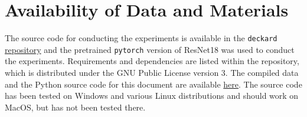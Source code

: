 \documentclass[sn-mathphys-num]{sn-jnl}%
\begin{document}
%
\clearpage
\section{Availability of Data and Materials}
The source code for conducting the experiments is available in the \texttt{deckard} \href{https://github.com/simplymathematics/deckard/tree/main/examples/power}{ repository} and the pretrained \texttt{pytorch} version of ResNet18 was used to conduct the experiments. Requirements and dependencies are listed within the repository, which is distributed under the GNU Public License version 3. The compiled data and the Python source code for this document are available \href{https://github.com/simplymathematics/kepler-ml}{here}. The source code has been tested on Windows and various Linux distributions and should work on MacOS, but has not been tested there.
\printglossary
\clearpage

\end{document}
